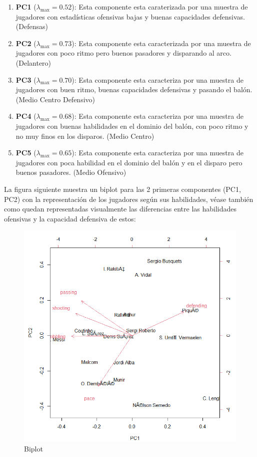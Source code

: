 \documentclass[a4paper,10pt,twocolumn]{article}
\begin{document}
\begin{enumerate}
	\item[] \textbf{PC1} ($\lambda_{\max} = 0.52$): Esta componente esta caraterizada por una muestra de jugadores con estadísticas ofensivas bajas y buenas capacidades defensivas. (Defensas)
	
	\item[] \textbf{PC2} ($\lambda_{\max} = 0.73$): Esta componente esta caracterizada por una muestra de jugadores con poco ritmo pero buenos pasadores y disparando al arco. (Delantero)
	
	\item[] \textbf{PC3} ($\lambda_{\max} = 0.70$): Esta componente esta caracteriza por una muestra de	jugadores con buen ritmo, buenas capacidades defensivas y pasando el balón. (Medio Centro Defensivo) 
	
	\item[] \textbf{PC4} ($\lambda_{\max} = 0.68$): Esta componente esta caracteriza por una muestra de	jugadores con buenas habilidades en el dominio del balón, con poco ritmo y no muy finos en los disparos. (Medio Centro)
	
	\item[] \textbf{PC5} ($\lambda_{\max} = 0.65$): Esta componente esta caracteriza por una muestra de	jugadores con poca habilidad en el dominio del balón y en el disparo pero buenos pasadores. (Medio Ofensivo) 
	
\end{enumerate} 

La figura siguiente muestra un biplot para las 2 primeras componentes (PC1, PC2) con la representación de los jugadores según sus habilidades, véase también como quedan representadas visualmente las diferencias entre las habilidades ofensivas y la capacidad defensiva de estos:

\begin{figure}[h]
	\includegraphics[scale=0.4]{./imgs/acp_biplot.png}
	\caption{Biplot}
\end{figure}

\label{end}
\end{document}
